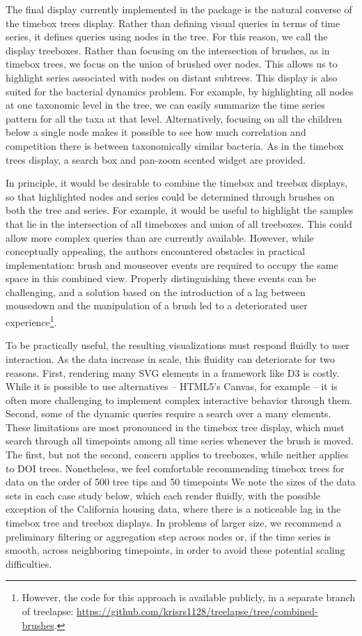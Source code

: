 The final display currently implemented in the package is the natural converse
of the timebox trees display. Rather than defining visual queries in terms of
time series, it defines queries using nodes in the tree. For this reason, we
call the display treeboxes. Rather than focusing on the intersection of brushes,
as in timebox trees, we focus on the union of brushed over nodes. This allows us
to highlight series associated with nodes on distant subtrees. This display is
also suited for the bacterial dynamics problem. For example, by highlighting all
nodes at one taxonomic level in the tree, we can easily summarize the time
series pattern for all the taxa at that level. Alternatively, focusing on all
the children below a single node makes it possible to see how much correlation
and competition there is between taxonomically similar bacteria. As in the
timebox trees display, a search box and pan-zoom scented widget are provided.

In principle, it would be desirable to combine the timebox and treebox displays,
so that highlighted nodes and series could be determined through brushes on both
the tree and series. For example, it would be useful to highlight the samples
that lie in the intersection of all timeboxes and union of all treeboxes. This
could allow more complex queries than are currently available. However, while
conceptually appealing, the authors encountered obstacles in practical
implementation: brush and mouseover events are required to occupy the same space
in this combined view. Properly distinguishing these events can be challenging,
and a solution based on the introduction of a lag between mousedown and the
manipulation of a brush led to a deteriorated user experience\footnote{However,
  the code for this approach is available publicly, in a separate branch of
  treelapse:
  \url{https://github.com/krisrs1128/treelapse/tree/combined-brushes}.}.

To be practically useful, the resulting visualizations must respond fluidly to
user interaction. As the data increase in scale, this fluidity can deteriorate
for two reasons. First, rendering many SVG elements in a framework like D3 is
costly\citep{johnson2008scalability}. While it is possible to use alternatives
-- HTML5's Canvas, for example -- it is often more challenging to implement
complex interactive behavior through them. Second, some of the dynamic queries
require a search over a many elements. These limitations are most pronounced in
the timebox tree display, which must search through all timepoints among all
time series whenever the brush is moved. The first, but not the second, concern
applies to treeboxes, while neither applies to DOI trees. Nonetheless, we feel
comfortable recommending timebox trees for data on the order of 500 tree tips
and 50 timepoints We note the sizes of the data sets in each case study below,
which each render fluidly, with the possible exception of the California housing
data, where there is a noticeable lag in the timebox tree and treebox displays.
In problems of larger size, we recommend a preliminary filtering or aggregation
step across nodes or, if the time series is smooth, across neighboring
timepoints, in order to avoid these potential scaling difficulties.


